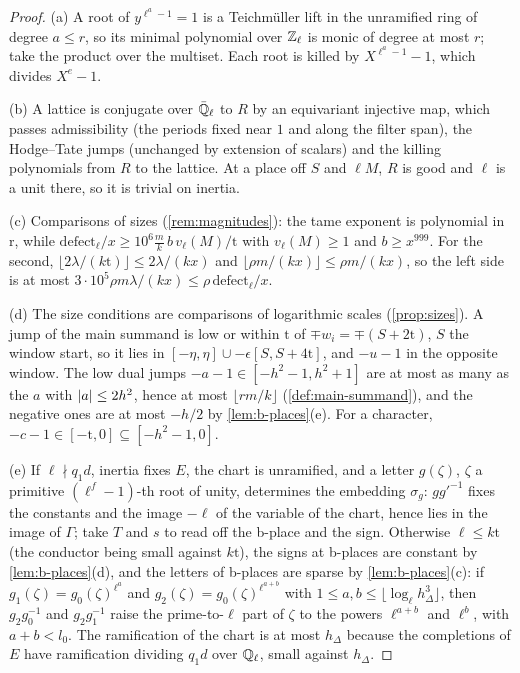 \begin{proof}
(a) A root of $y^{\ell^a-1}=1$ is a Teichm\"uller lift in the unramified ring of degree $a\le r$, so its minimal polynomial over $\mathbb{Z}_\ell$ is monic of degree at most $r$; take the product over the multiset. Each root is killed by $X^{\ell^a-1}-1$,
which divides $X^e-1$.

(b) A lattice is conjugate over $\bar{\mathbb{Q}}_\ell$ to $R$ by an equivariant injective map, which passes admissibility (the periods fixed near $1$ and along the filter span), the Hodge--Tate jumps (unchanged by extension of scalars) and the
killing polynomials from $R$ to the lattice. At a place off $S$ and $\ell M$, $R$ is good and $\ell$ is a unit there, so it is trivial on inertia.

(c) Comparisons of sizes (\cref{rem:magnitudes}): the tame exponent is polynomial in $\mathrm r$, while $\mathrm{defect}_\ell/x\ge10^6\frac mk\,b\,v_\ell(M)/\mathrm t$ with $v_\ell(M)\ge1$ and $b\ge x^{999}$. For the second, $\lfloor2\lambda/(k\mathrm t)\rfloor\le2\lambda/(kx)$ and
$\lfloor\rho m/(kx)\rfloor\le\rho m/(kx)$, so the left side is at most $3\cdot10^5\rho m\lambda/(kx)\le\rho\,\mathrm{defect}_\ell/x$.

(d) The size conditions are comparisons of logarithmic scales (\cref{prop:sizes}). A jump of the main summand is low or within $\mathrm t$ of $\mp w_i=\mp(S+2\mathrm t)$, $S$ the window start, so it lies in $[-\eta,\eta]\cup-\epsilon[S,S+4\mathrm t]$, and $-u-1$ in the opposite
window. The low dual jumps $-a-1\in[-h^2-1,h^2+1]$ are at most as many as the $a$ with $\lvert a\rvert\le2h^2$, hence at most $\lfloor rm/k\rfloor$ (\cref{def:main-summand}), and the negative ones are at most $-h/2$ by \cref{lem:b-places}(e). For a character,
$-c-1\in[-\mathrm t,0]\subseteq[-h^2-1,0]$.

(e) If $\ell\nmid q_1d$, inertia fixes $E$, the chart is unramified, and a letter $g(\zeta)$, $\zeta$ a primitive $(\ell^f-1)$-th root of unity, determines the embedding $\sigma_g$: $gg'^{-1}$ fixes the constants and the image $-\ell$ of the variable of the
chart, hence lies in the image of $\Gamma$; take $T$ and $s$ to read off the b-place and the sign. Otherwise $\ell\le k\mathrm t$ (the conductor being small against $k\mathrm t$), the signs at b-places are constant by \cref{lem:b-places}(d), and the
letters of b-places are sparse by \cref{lem:b-places}(c): if $g_1(\zeta)=g_0(\zeta)^{\ell^a}$ and $g_2(\zeta)=g_0(\zeta)^{\ell^{a+b}}$ with $1\le a,b\le\lfloor\log_\ell h_\Delta^3\rfloor$, then $g_2g_0^{-1}$ and $g_2g_1^{-1}$ raise the prime-to-$\ell$ part of $\zeta$ to the powers
$\ell^{a+b}$ and $\ell^b$, with $a+b<l_0$. The ramification of the chart is at most $h_\Delta$ because the completions of $E$ have ramification dividing $q_1d$ over $\mathbb{Q}_\ell$, small against $h_\Delta$.
\end{proof}

